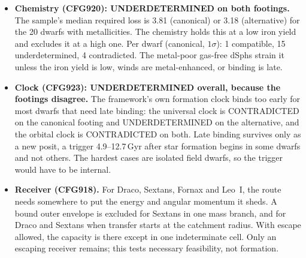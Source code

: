 \documentclass[10pt]{article}
\begin{document}
\begin{itemize}
\item \textbf{Chemistry (CFG920): UNDERDETERMINED on both footings.} The sample's median required loss is 3.81 (canonical) or 3.18 (alternative) for the 20 dwarfs with metallicities. The chemistry holds this at a low iron yield and excludes it at a high one. Per dwarf (canonical, $1\sigma$): 1 compatible, 15 underdetermined, 4 contradicted. The metal-poor gas-free dSphs strain it unless the iron yield is low, winds are metal-enhanced, or binding is late.
\item \textbf{Clock (CFG923): UNDERDETERMINED overall, because the footings disagree.} The framework's own formation clock binds too early for most dwarfs that need late binding: the universal clock is CONTRADICTED on the canonical footing and UNDERDETERMINED on the alternative, and the orbital clock is CONTRADICTED on both. Late binding survives only as a new posit, a trigger 4.9--12.7\,Gyr after star formation begins in some dwarfs and not others. The hardest cases are isolated field dwarfs, so the trigger would have to be internal.
\item \textbf{Receiver (CFG918).} For Draco, Sextans, Fornax and Leo~I, the route needs somewhere to put the energy and angular momentum it sheds. A bound outer envelope is excluded for Sextans in one mass branch, and for Draco and Sextans when transfer starts at the catchment radius. With escape allowed, the capacity is there except in one indeterminate cell. Only an escaping receiver remains; this tests necessary feasibility, not formation.
\end{itemize}
\end{document}

